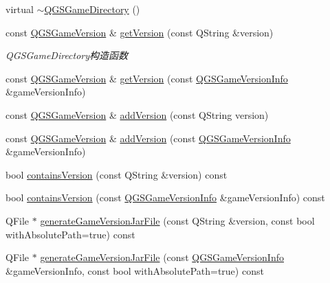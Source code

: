 \begin{DoxyCompactItemize}
\item 
virtual \mbox{\hyperlink{class_q_g_s_game_directory_a33ccb1a49ccec2485a778adf0c1394cd}{$\sim$\+Q\+G\+S\+Game\+Directory}} ()
\item 
const \mbox{\hyperlink{class_q_g_s_game_version}{Q\+G\+S\+Game\+Version}} \& \mbox{\hyperlink{class_q_g_s_game_directory_a5bc0793dc5f9475e80c68842f30b24f9}{get\+Version}} (const Q\+String \&version)
\begin{DoxyCompactList}\small\item\em Q\+G\+S\+Game\+Directory构造函数 \end{DoxyCompactList}\item 
const \mbox{\hyperlink{class_q_g_s_game_version}{Q\+G\+S\+Game\+Version}} \& \mbox{\hyperlink{class_q_g_s_game_directory_a070fd0a7126b2bd5e9b58ed447c53b67}{get\+Version}} (const \mbox{\hyperlink{class_q_g_s_game_version_info}{Q\+G\+S\+Game\+Version\+Info}} \&game\+Version\+Info)
\item 
const \mbox{\hyperlink{class_q_g_s_game_version}{Q\+G\+S\+Game\+Version}} \& \mbox{\hyperlink{class_q_g_s_game_directory_a4a8c72509f4a3eb15a825961c596eee9}{add\+Version}} (const Q\+String version)
\item 
const \mbox{\hyperlink{class_q_g_s_game_version}{Q\+G\+S\+Game\+Version}} \& \mbox{\hyperlink{class_q_g_s_game_directory_ace94804b67499a105a73d6d355ecce20}{add\+Version}} (const \mbox{\hyperlink{class_q_g_s_game_version_info}{Q\+G\+S\+Game\+Version\+Info}} \&game\+Version\+Info)
\item 
bool \mbox{\hyperlink{class_q_g_s_game_directory_ac7ffc5f939d69fea1a609fc516fbb96c}{contains\+Version}} (const Q\+String \&version) const
\item 
bool \mbox{\hyperlink{class_q_g_s_game_directory_a725227fce0dc089f036f90ae5b44caae}{contains\+Version}} (const \mbox{\hyperlink{class_q_g_s_game_version_info}{Q\+G\+S\+Game\+Version\+Info}} \&game\+Version\+Info) const
\item 
Q\+File $\ast$ \mbox{\hyperlink{class_q_g_s_game_directory_ae7d872759817bd28c126f53a9573fefe}{generate\+Game\+Version\+Jar\+File}} (const Q\+String \&version, const bool with\+Absolute\+Path=true) const
\item 
Q\+File $\ast$ \mbox{\hyperlink{class_q_g_s_game_directory_a87d6c24b0d8af77e86b02f4dd80c90ac}{generate\+Game\+Version\+Jar\+File}} (const \mbox{\hyperlink{class_q_g_s_game_version_info}{Q\+G\+S\+Game\+Version\+Info}} \&game\+Version\+Info, const bool with\+Absolute\+Path=true) const
\item 

\end{DoxyCompactItemize}
